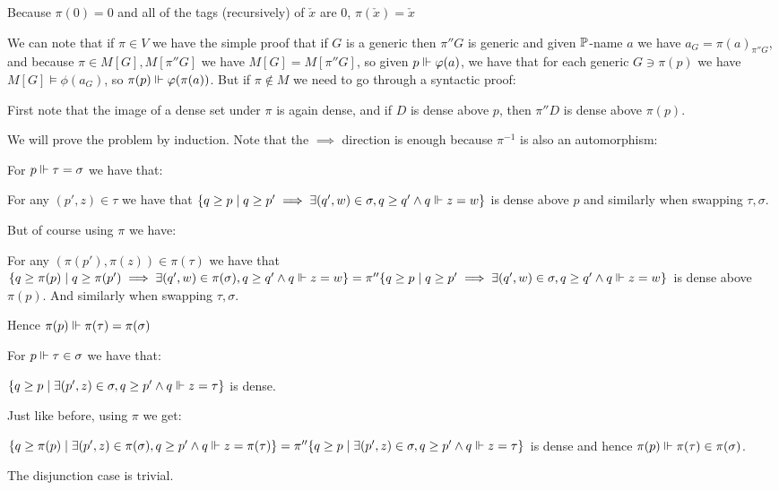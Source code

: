 \begin{cExercise}
	\begin{cPart}
		Because $\pi(0)=0$ and all of the tags (recursively) of $\check x$ are $0$, $\pi(\check x)=\check x$
	\end{cPart}
	\begin{cPart}
		We can note that if $\pi\in V$ we have the simple proof that if $G$ is a generic then $\pi''G$ is generic and given $\P$-name $a$ we have $a_G=\pi(a)_{\pi''G}$, and because $\pi\in M[G],M[\pi''G]$ we have $M[G]=M[\pi''G]$, so given $p\force \phi(a)$, we have that for each generic $G\ni \pi(p)$ we have $M[G]\models\phi(a_G)$, so $\pi(p)\force \phi(\pi(a))$. But if $\pi\notin M$ we need to go through a syntactic proof:
		
		First note that the image of a dense set under $\pi$ is again dense, and if $D$ is dense above $p$, then $\pi''D$ is dense above $\pi(p)$.
		
		We will prove the problem by induction. Note that the $\implies$ direction is enough because $\pi^{-1}$ is also an automorphism:
		
		For $p\force \tau=\sigma$ we have that:
		
		For any $(p',z)\in \tau$ we have that $\{q\ge p\mid q\ge p'\implies \exists(q',w)\in\sigma, q\ge q'\land q\force z=w\}$ is dense above $p$ and similarly when swapping $\tau,\sigma$.
		
		But of course using $\pi$ we have:
		
		For any $(\pi(p'),\pi(z))\in \pi(\tau)$ we have that $\{q\ge \pi(p)\mid q\ge \pi(p')\implies \exists(q',w)\in\pi(\sigma), q\ge q'\land q\force z=w\}=\pi''\{q\ge p\mid q\ge p'\implies \exists(q',w)\in\sigma, q\ge q'\land q\force z=w\}$ is dense above $\pi(p)$. And similarly when swapping $\tau,\sigma$.
		
		Hence $\pi(p)\force \pi(\tau)=\pi(\sigma)$
		
		For $p\force \tau\in\sigma$ we have that:
		
		$\{q\ge p\mid \exists(p',z)\in \sigma,q\ge p'\land q\force z=\tau\}$ is dense.
		
		Just like before, using $\pi$ we get:
		
		$\{q\ge \pi(p)\mid \exists(p',z)\in \pi(\sigma),q\ge p'\land q\force z=\pi(\tau)\}=\pi''\{q\ge p\mid \exists(p',z)\in \sigma,q\ge p'\land q\force z=\tau\}$ is dense and hence $\pi(p)\force \pi(\tau)\in\pi(\sigma)$.
		
		The disjunction case is trivial.
		

\end{cPart}
\end{cExercise}
